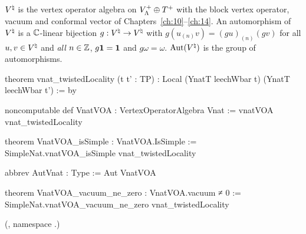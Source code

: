 \begin{definition}\label{ch20:def:vnat}
${V^{\natural}}$ is the vertex operator algebra on $V_{\Lambda}^{+}\oplus T^{+}$ with the block vertex operator, vacuum and
conformal vector of Chapters~\ref{ch:10}--\ref{ch:14}.  An automorphism of ${V^{\natural}}$ is a ${\mathbb{C}}$-linear bijection
$g:{V^{\natural}}\to{V^{\natural}}$ with $g(u_{(n)}v)=(gu)_{(n)}(gv)$ for all $u,v\in{V^{\natural}}$ and \emph{all} $n\in{\mathbb{Z}}$,
$g\mathbf 1=\mathbf 1$ and $g\omega=\omega$.  $\operatorname{Aut}({V^{\natural}})$ is the group of automorphisms.
\end{definition}
\begin{leancode}
theorem vnat_twistedLocality (t t' : TP) : Local (YnatT leechWbar t) (YnatT leechWbar t') := by

noncomputable def VnatVOA : VertexOperatorAlgebra Vnat := vnatVOA vnat_twistedLocality

theorem VnatVOA_isSimple : VnatVOA.IsSimple :=
  SimpleNat.vnatVOA_isSimple vnat_twistedLocality

abbrev AutVnat : Type := Aut VnatVOA

theorem VnatVOA_vacuum_ne_zero : VnatVOA.vacuum ≠ 0 :=
  SimpleNat.vnatVOA_vacuum_ne_zero vnat_twistedLocality
\end{leancode}
(, namespace .)

